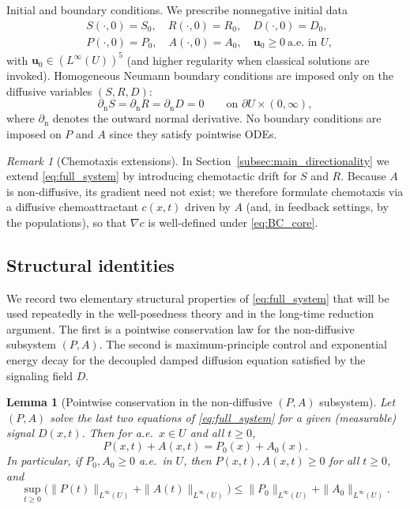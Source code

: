 \documentclass[pdflatex,sn-mathphys-ay]{sn-jnl}
\theoremstyle{thmstyleone}
\newtheorem{lemma}[theorem]{Lemma}
\theoremstyle{definition}
\theoremstyle{remark}
\newtheorem{remark}[theorem]{Remark}
\begin{document}
Initial and boundary conditions. We prescribe nonnegative initial data
\begin{equation}
\begin{aligned}
\label{eq:IC_core}
&S(\cdot,0)=S_0,\quad R(\cdot,0)=R_0,\quad D(\cdot,0)=D_0,\\[6pt] &P(\cdot,0)=P_0,\quad A(\cdot,0)=A_0, \quad \mathbf{u}_0\ge 0\ \text{a.e.\ in }U,
\end{aligned}
\end{equation}
with $\mathbf{u}_0\in (L^\infty(U))^5$ (and higher regularity when classical solutions are invoked).
Homogeneous Neumann boundary conditions are imposed only on the diffusive variables $(S,R,D)$:
\begin{equation}
\label{eq:BC_core}
\partial_{\mathrm n}S=\partial_{\mathrm n}R=\partial_{\mathrm n}D=0
\qquad \text{on }\partial U\times(0,\infty),
\end{equation}
where $\partial_{\mathrm n}$ denotes the outward normal derivative.
No boundary conditions are imposed on $P$ and $A$ since they satisfy pointwise ODEs.

\begin{remark}[Chemotaxis extensions]
In Section~\ref{subsec:main_directionality} we extend \eqref{eq:full_system} by introducing chemotactic drift for $S$ and $R$.
Because $A$ is non-diffusive, its gradient need not exist; we therefore formulate chemotaxis via a diffusive chemoattractant $c(x,t)$
driven by $A$ (and, in feedback settings, by the populations), so that $\nabla c$ is well-defined under \eqref{eq:BC_core}.    
\end{remark}

\subsection{Structural identities}
\label{subsec:structural_identities}

We record two elementary structural properties of \eqref{eq:full_system} that will be used repeatedly in the well-posedness
theory and in the long-time reduction argument. The first is a pointwise conservation law for the non-diffusive subsystem
$(P,A)$. The second is maximum-principle control and exponential energy decay for the decoupled damped diffusion equation
satisfied by the signaling field $D$.

\begin{lemma}[Pointwise conservation in the non-diffusive $(P,A)$ subsystem]
\label{lem:PA_conservation}
Let $(P,A)$ solve the last two equations of \eqref{eq:full_system} for a given (measurable) signal $D(x,t)$.
Then for a.e.\ $x\in U$ and all $t\ge 0$,
\begin{equation}
\label{eq:PA_conservation}
P(x,t)+A(x,t)=P_0(x)+A_0(x).
\end{equation}
In particular, if $P_0,A_0\ge 0$ a.e.\ in $U$, then $P(x,t),A(x,t)\ge 0$ for all $t\ge 0$, and
\begin{equation}
\label{eq:PA_Linfty_bound}
\sup_{t\ge0}\bigl(\|P(t)\|_{L^\infty(U)}+\|A(t)\|_{L^\infty(U)}\bigr)
\le \|P_0\|_{L^\infty(U)}+\|A_0\|_{L^\infty(U)}.
\end{equation}
\end{lemma}
\end{document}
